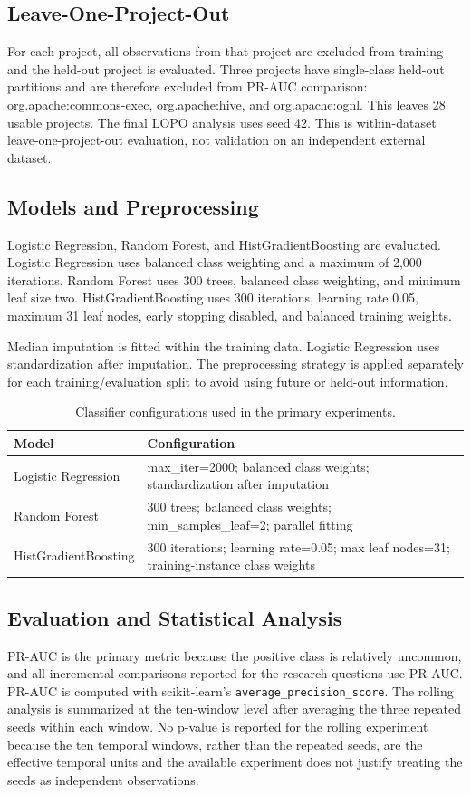\documentclass[conference]{IEEEtran}
\begin{document}
\subsection{Leave-One-Project-Out}
For each project, all observations from that project are excluded from training and the held-out project is evaluated. Three projects have single-class held-out partitions and are therefore excluded from PR-AUC comparison: org.apache:commons-exec, org.apache:hive, and org.apache:ognl. This leaves 28 usable projects. The final LOPO analysis uses seed 42. This is within-dataset leave-one-project-out evaluation, not validation on an independent external dataset.

\subsection{Models and Preprocessing}
Logistic Regression, Random Forest, and HistGradientBoosting are evaluated. Logistic Regression uses balanced class weighting and a maximum of 2,000 iterations. Random Forest uses 300 trees, balanced class weighting, and minimum leaf size two. HistGradientBoosting uses 300 iterations, learning rate 0.05, maximum 31 leaf nodes, early stopping disabled, and balanced training weights.

Median imputation is fitted within the training data. Logistic Regression uses standardization after imputation. The preprocessing strategy is applied separately for each training/evaluation split to avoid using future or held-out information.

\begin{table}[t]
\centering
\caption{Classifier configurations used in the primary experiments.}
\label{tab:models}
\scriptsize
\begin{tabular}{p{2.2cm}p{4.3cm}}
\toprule
Model & Configuration\\
\midrule
Logistic Regression & max\_iter=2000; balanced class weights; standardization after imputation\\
Random Forest & 300 trees; balanced class weights; min\_samples\_leaf=2; parallel fitting\\
HistGradientBoosting & 300 iterations; learning rate=0.05; max leaf nodes=31; training-instance class weights\\
\bottomrule
\end{tabular}
\end{table}

\subsection{Evaluation and Statistical Analysis}
PR-AUC is the primary metric because the positive class is relatively uncommon, and all incremental comparisons reported for the research questions use PR-AUC. PR-AUC is computed with scikit-learn's \texttt{average\_precision\_score}. The rolling analysis is summarized at the ten-window level after averaging the three repeated seeds within each window. No p-value is reported for the rolling experiment because the ten temporal windows, rather than the repeated seeds, are the effective temporal units and the available experiment does not justify treating the seeds as independent observations.
\end{document}

